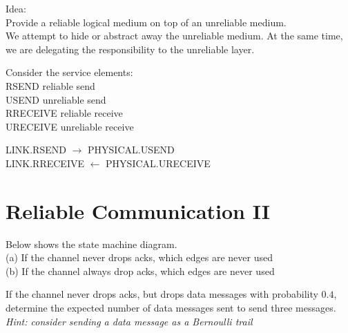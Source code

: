 Idea:\\
Provide a reliable logical medium on top of an unreliable medium. \\
We attempt to hide or abstract away the unreliable medium. 
At the same time, we are delegating the responsibility to the 
unreliable layer. 

Consider the service elements:\\
\textsf{RSEND} reliable send \\
\textsf{USEND} unreliable send \\
\textsf{RRECEIVE} reliable receive \\
\textsf{URECEIVE} unreliable receive 


\textsf{LINK}.\textsf{RSEND} $\rightarrow$ \textsf{PHYSICAL}.\textsf{USEND}\\
\textsf{LINK}.\textsf{RRECEIVE} $\leftarrow$ \textsf{PHYSICAL}.\textsf{URECEIVE}\\


\section{Reliable Communication II}



\frmrule 



\frmrule 


\begin{example}
Below shows the state machine diagram. \\
(a) If the channel never drops acks, which edges are never used\\
(b) If the channel always drop acks, which edges are never used
\end{example}


\frmrule 

\begin{example}
If the channel never drops acks, but drops data messages with probability $0.4$, 
determine the expected number of data messages sent to send three messages.
\\ \textit{Hint: consider sending a data message as a Bernoulli trail}
\end{example}


